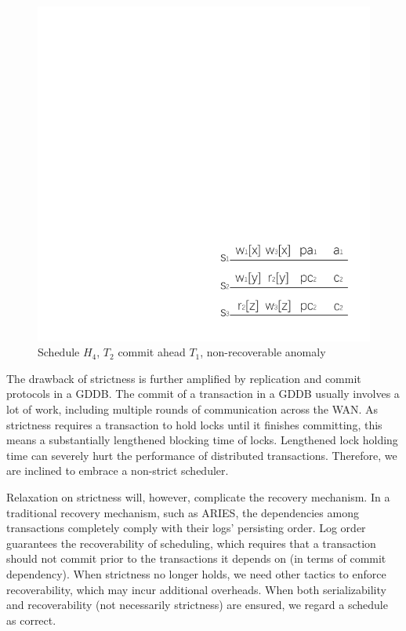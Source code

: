\documentclass[conference]{IEEEtran}
\begin{document}
\begin{figure}[tbp]
  \centerline{\includegraphics[scale=0.8]{figure/schedule_not_recoverable.pdf}}
  \caption{Schedule ${H_4}$, ${T_2}$ commit ahead ${T_1}$, non-recoverable anomaly}
  \label{fig:schedule_not_recoverable}
\end{figure}


The drawback of strictness is further amplified by replication and commit protocols in a GDDB.
The commit of a transaction in a GDDB usually involves a lot of work, including multiple rounds of communication across the WAN.
As strictness requires a transaction to hold locks until it finishes committing, this means a substantially lengthened blocking time of locks.
Lengthened lock holding time can severely hurt the performance of distributed transactions.
Therefore, we are inclined to embrace a non-strict scheduler.

Relaxation on strictness will, however, complicate the recovery mechanism.
In a traditional recovery mechanism, such as ARIES, the dependencies among transactions completely comply with their logs' persisting order.
Log order guarantees the recoverability of scheduling, which requires that a transaction should not commit prior to the transactions it depends on (in terms of commit dependency).
When strictness no longer holds, we need other tactics to enforce recoverability, which may incur additional overheads.
When both serializability and recoverability (not necessarily strictness) are ensured, we regard a schedule as correct.
\end{document}
